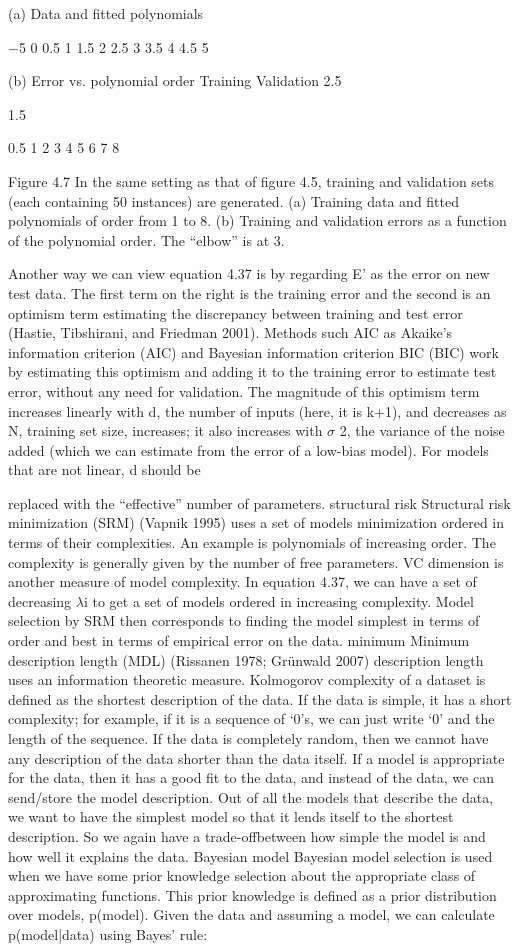 (a) Data and fitted polynomials

$-$5 0 0.5 1 1.5 2 2.5 3 3.5 4 4.5 5

(b) Error vs. polynomial order Training Validation 2.5

1.5

0.5 1 2 3 4 5 6 7 8

Figure 4.7 In the same setting as that of figure 4.5, training and validation sets (each containing 50 instances) are generated. (a) Training data and fitted polynomials of order from 1 to 8. (b) Training and validation errors as a function of the polynomial order. The “elbow” is at 3.

Another way we can view equation 4.37 is by regarding E' as the error on new test data. The first term on the right is the training error and the second is an optimism term estimating the discrepancy between training and test error (Hastie, Tibshirani, and Friedman 2001). Methods such AIC as Akaike’s information criterion (AIC) and Bayesian information criterion BIC (BIC) work by estimating this optimism and adding it to the training error to estimate test error, without any need for validation. The magnitude of this optimism term increases linearly with d, the number of inputs (here, it is k+1), and decreases as N, training set size, increases; it also increases with $\sigma$ 2, the variance of the noise added (which we can estimate from the error of a low-bias model). For models that are not linear, d should be

replaced with the “effective” number of parameters. structural risk Structural risk minimization (SRM) (Vapnik 1995) uses a set of models minimization ordered in terms of their complexities. An example is polynomials of increasing order. The complexity is generally given by the number of free parameters. VC dimension is another measure of model complexity. In equation 4.37, we can have a set of decreasing $\lambda$i to get a set of models ordered in increasing complexity. Model selection by SRM then corresponds to finding the model simplest in terms of order and best in terms of empirical error on the data. minimum Minimum description length (MDL) (Rissanen 1978; Grünwald 2007) description length uses an information theoretic measure. Kolmogorov complexity of a dataset is defined as the shortest description of the data. If the data is simple, it has a short complexity; for example, if it is a sequence of ‘0’s, we can just write ‘0’ and the length of the sequence. If the data is completely random, then we cannot have any description of the data shorter than the data itself. If a model is appropriate for the data, then it has a good fit to the data, and instead of the data, we can send/store the model description. Out of all the models that describe the data, we want to have the simplest model so that it lends itself to the shortest description. So we again have a trade-offbetween how simple the model is and how well it explains the data. Bayesian model Bayesian model selection is used when we have some prior knowledge selection about the appropriate class of approximating functions. This prior knowledge is defined as a prior distribution over models, p(model). Given the data and assuming a model, we can calculate p(model|data) using Bayes’ rule:

